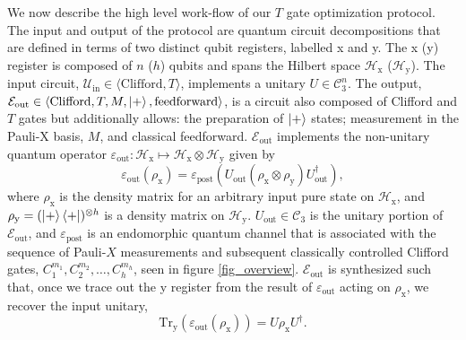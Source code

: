 \documentclass[notitlepage]{article}
\theoremstyle{definition}
\theoremstyle{problem}
\theoremstyle{lemma}
\begin{document}
We now describe the high level work-flow of our $T$ gate optimization protocol.
The input and output of the protocol are quantum circuit decompositions that are defined in terms of two distinct qubit registers, labelled x and y. The x (y) register is composed of $n$ ($h$) qubits and spans the Hilbert space $\mathcal{H}_{\text{x}}$ ($\mathcal{H}_{\text{y}}$). The input circuit, $\mathcal{U}_{\text{in}} \in \langle \mathrm{Clifford}, T \rangle$, implements a unitary $U \in \mathcal{C}_3^n$. The output, $\mathcal{E}_{\text{out}}  \in \langle \mathrm{Clifford}, T, M, \left\vert{+}\right\rangle, \mathrm{feedforward} \rangle $, is a circuit also composed of Clifford and $T$ gates but additionally allows: the preparation of $\left\vert{+}\right\rangle$ states; measurement in the Pauli-X basis, $M$, and classical feedforward. $\mathcal{E}_{\text{out}}$ implements the non-unitary quantum operator $\varepsilon_{\text{out}}:\mathcal{H}_{\text{x}} \mapsto \mathcal{H}_{\text{x}}\otimes \mathcal{H}_{\text{y}}$ given by
\begin{equation}
\label{e_out_1}
\varepsilon_{\text{out}}(\rho_{\text{x}}) = \varepsilon_{\text{post}}(U_{\text{out}}(\rho_{\text{x}}\otimes\rho_{\text{y}})U_{\text{out}}^\dagger),
\end{equation}
where $\rho_{\text{x}}$ is the density matrix for an arbitrary input pure state on $\mathcal{H}_\text{x}$, and $\rho_{\text{y}}=(\left\vert{+}\right\rangle\left\langle{+}\right\vert)^{\otimes h}$ is a density matrix on  $\mathcal{H}_\text{y}$. $U_{\text{out}}\in \mathcal{C}_3$ is the unitary portion of $\mathcal{E}_{\text{out}}$, and $\varepsilon_{\text{post}}$ is an endomorphic quantum channel that is associated with the sequence of Pauli-$X$ measurements and subsequent classically controlled Clifford gates, $C_1^{m_1},C_2^{m_2},\dots,C_h^{m_h}$, seen in figure \ref{fig_overview}. $\mathcal{E}_{\text{out}}$ is synthesized such that, once we trace out the y register from the result of $\varepsilon_{\text{out}}$ acting on $\rho_{\text{x}}$, we recover the input unitary,
\begin{equation}
\label{e_out_2}
\mathrm{Tr}_{\text{y}}(\varepsilon_{\text{out}}(\rho_{\text{x}})) = U\rho_{\text{x}}U^\dagger.
\end{equation}
\end{document}
